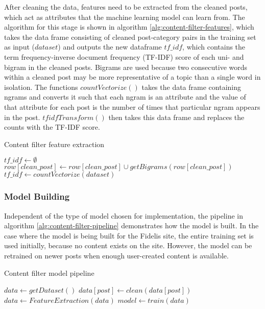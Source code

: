 After cleaning the data, features need to be extracted from the cleaned posts, which act as attributes that the machine learning model can learn from. The algorithm for this stage is shown in algorithm \ref{alg:content-filter-features}, which takes the data frame consisting of cleaned post-category pairs in the training set as input ($dataset$) and outputs the new dataframe $tf\_idf$, which contains the term frequency-inverse document frequency (TF-IDF) score of each uni- and bigram in the cleaned posts. Bigrams are used because two consecutive words within a cleaned post may be more representative of a topic than a single word in isolation. The functions $countVectorize()$ takes the data frame containing ngrams and converts it such that each ngram is an attribute and the value of that attribute for each post is the number of times that particular ngram appears in the post. $tfidfTransform()$ then takes this data frame and replaces the counts with the TF-IDF score.

\begin{algorithm}[H]
\caption{Content filter feature extraction}
\label{alg:content-filter-features}
\begin{algorithmic}[1]
\State $tf\_idf\gets \emptyset$
    \State $row[clean\_post]\gets row[clean\_post]\cup getBigrams(row[clean\_post])$
\EndFor
\State $tf\_idf\gets countVectorize(dataset)$
\State {}
\EndFunction
\end{algorithmic}
\end{algorithm}

\subsubsection{Model Building}
Independent of the type of model chosen for implementation, the pipeline in algorithm \ref{alg:content-filter-pipeline} demonstrates how the model is built. In the case where the model is being built for the Fidelis site, the entire training set is used initially, because no content exists on the site. However, the model can be retrained on newer posts when enough user-created content is available.

\begin{algorithm}[H]
\caption{Content filter model pipeline}
\label{alg:content-filter-pipeline}
\begin{algorithmic}[1]
\State $data\gets getDataset()$
    \State $data[post]\gets clean(data[post])$
\EndFor
\State $data\gets FeatureExtraction(data)$
\State $model \gets train(data)$
\end{algorithmic}
\end{algorithm}

